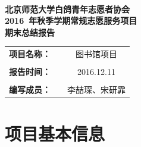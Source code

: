 \documentclass[nocover]{lizhechen}
\begin{document}
	
	\begin{center}
		\ 
		\\[20ex]
		{\heiti\huge \textbf{北京师范大学白鸽青年志愿者协会}}\\[3ex]
		{\heiti\huge \textbf{2016~年秋季学期常规志愿服务项目}}\\[3ex]
		{\heiti\huge \textbf{期末总结报告}}
		\\[70ex]
		\begin{table}[H]
			\begin{center}
				\begin{tabular}{ccc}
					{\Large \textbf{项目名称：}} & & {\Large 图书馆项目} \\
					 &  & \\
					{\Large \textbf{报告时间：}} & & {\Large 2016.12.11} \\
					 &  & \\
					{\Large \textbf{编写成员：}} & & {\Large 李喆琛、宋研霏} \\
				\end{tabular}
			\end{center}
		\end{table}
	\end{center}
	
	\section{项目基本信息}
\end{document}
